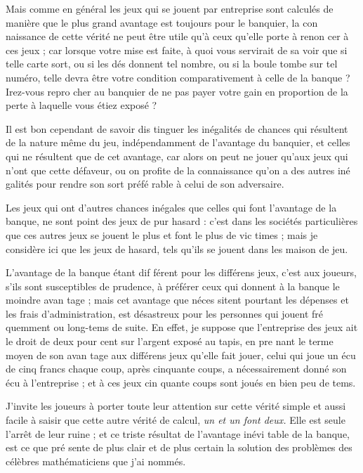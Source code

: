 Mais comme en général les jeux qui
se jouent par entreprise sont calculés
de manière que le plus grand avantage
est toujours pour le banquier, la con%
naissance de cette vérité ne peut être
utile qu'à ceux qu'elle porte à renon%
cer à ces jeux ; car lorsque votre mise
est faite, à quoi vous servirait de sa%
voir que si telle carte sort, ou si les
dés donnent tel nombre, ou si la boule
tombe sur tel numéro, telle devra être
votre condition comparativement à
celle de la banque ? Irez-vous repro%
cher au banquier de ne pas payer 
votre gain en proportion de la perte à
laquelle vous étiez exposé ?

Il est bon cependant de savoir dis%
tinguer les inégalités de chances qui
résultent de la nature même du jeu,
indépendamment de l'avantage du 
banquier, et celles qui ne résultent
que de cet avantage, car alors on peut
ne jouer qu'aux jeux qui n'ont que
cette défaveur, ou on profite de la 
connaissance qu'on a des autres iné%
galités pour rendre son sort préfé%
rable à celui de son adversaire.

Les jeux qui ont d'autres chances
inégales que celles qui font l'avantage
de la banque, ne sont point des jeux
de pur hasard : c'est dans les sociétés
particulières que ces autres jeux se
jouent le plus et font le plus de vic%
times ; mais je considère ici que
les jeux de hasard, tels qu'ils se jouent
dans les maison de jeu.

L'avantage de la banque étant dif%
férent pour les différens jeux, c'est
aux joueurs, s'ils sont susceptibles
de prudence, à préférer ceux qui
donnent à la banque le moindre avan%
tage ; mais cet avantage que néces%
sitent pourtant les dépenses et les 
frais d'administration, est désastreux
pour les personnes qui jouent fré%
quemment ou long-tems de suite. En
effet, je suppose que l'entreprise des
jeux ait le droit de deux pour cent 
sur l'argent exposé au tapis, en pre%
nant le terme moyen de son avan%
tage aux différens jeux qu'elle fait
jouer, celui qui joue un écu de cinq
francs chaque coup, après cinquante
coups, a nécessairement donné son
écu à l'entreprise ; et à ces jeux cin%
quante coups sont joués en bien peu
de tems.

J'invite les joueurs à porter toute
leur attention sur cette vérité simple
et aussi facile à saisir que cette autre
vérité de calcul, \emph{un et un font deux.}
Elle est seule l'arrêt de leur ruine ; et
ce triste résultat de l'avantage inévi%
table de la banque, est ce que pré%
sente de plus clair et de plus certain
la solution des problèmes des célèbres
mathématiciens que j'ai nommés.

